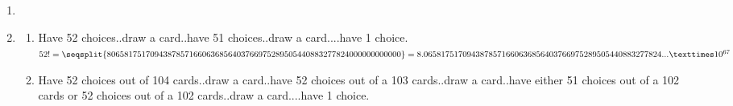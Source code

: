 \documentclass[pdftex,12pt,a4paper]{article}
\begin{document}


\begin{enumerate}
    \item
    \item
        \begin{enumerate}
            \item
                Have 52 choices..draw a card..have 51 choices..draw a card....have 1 choice.\\

                $ 52! = 
                    \seqsplit{%
                    80658175170943878571660636856403766975289505440883277824000000000000}\\ = 8.0658175170943878571660636856403766975289505440883277824... × 10^{67}$
            \item
                Have 52 choices out of 104 cards..draw a card..have 52 choices out of a 103 cards..draw a card..have either 51 choices out of a 102 cards or 52 choices out of a 102 cards..draw a card....have 1 choice.\\


\end{enumerate}
\end{enumerate}
\end{document}
